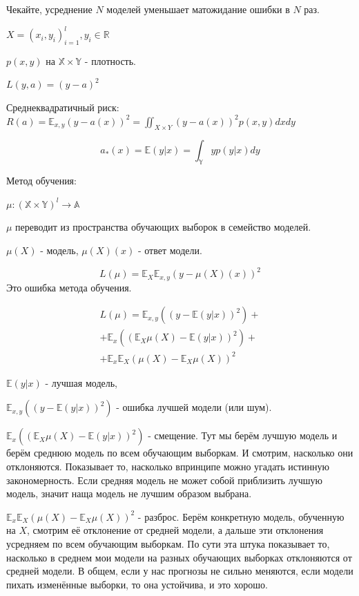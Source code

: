 \documentclass[a4paper]{article}
\begin{document}
\begin{itemize}
Чекайте, усреднение $N$ моделей уменьшает матожидание ошибки в $N$ раз.

$X = (x_i, y_i)_{i=1}^l, y_i \in \mathbb{R}$

$p(x, y)$ на $\mathbb{X} \times \mathbb{Y}$ - плотность.

$L(y, a) = (y-a)^2$

Среднеквадратичный риск: $R(a) = \mathbb{E}_{x, y} (y-a(x))^2 = \iint_{X \times Y} (y-a(x))^2 p(x, y) dxdy$

\[ a_*(x) = \mathbb{E} (y|x) = \int_\mathbb{Y} yp(y|x) dy \]

Метод обучения:

$\mu: (\mathbb{X} \times \mathbb{Y})^l \rightarrow \mathbb{A}$

$\mu$ переводит из пространства обучающих выборок в семейство моделей.

$\mu(X)$ - модель, $\mu(X)(x)$ - ответ модели.

\[ L(\mu) = \mathbb{E}_X \mathbb{E}_{x, y} (y - \mu(X)(x))^2 \]
Это ошибка метода обучения.

\begin{equation}
\begin{gathered}
L(\mu) = \mathbb{E}_{x, y} \left( \left( y - \mathbb{E}(y|x) \right)^2 \right) + \\
+ \mathbb{E}_x \left( \left(\mathbb{E}_X \mu(X) - \mathbb{E} (y|x) \right)^2 \right) + \\
+ \mathbb{E}_x \mathbb{E}_X \left( \mu(X) - \mathbb{E}_X \mu(X) \right)^2
\end{gathered}
\end{equation}

$\mathbb{E}(y|x)$ - лучшая модель,

$\mathbb{E}_{x, y} \left( \left( y - \mathbb{E}(y|x) \right)^2 \right)$ - ошибка лучшей модели (или шум).

$\mathbb{E}_x \left( \left(\mathbb{E}_X \mu(X) - \mathbb{E} (y|x) \right)^2 \right)$ - смещение. Тут мы берём лучшую модель и берём среднюю модель по всем обучающим выборкам. И смотрим, насколько они отклоняются. Показывает то, насколько впринципе можно угадать истинную закономерность. Если средняя модель не может собой приблизить лучшую модель, значит наща модель не лучшим образом выбрана.

$\mathbb{E}_x \mathbb{E}_X \left( \mu(X) - \mathbb{E}_X \mu(X) \right)^2$ - разброс. Берём конкретную модель, обученную на $X$, смотрим её отклонение от средней модели, а дальше эти отклонения усредняем по всем обучающим выборкам. По сути эта штука показывает то, насколько в среднем мои модели на разных обучающих выборках отклоняются от средней модели. В общем, если у нас прогнозы не сильно меняются, если модели пихать изменённые выборки, то она устойчива, и это хорошо.


\end{itemize}
\end{document}
